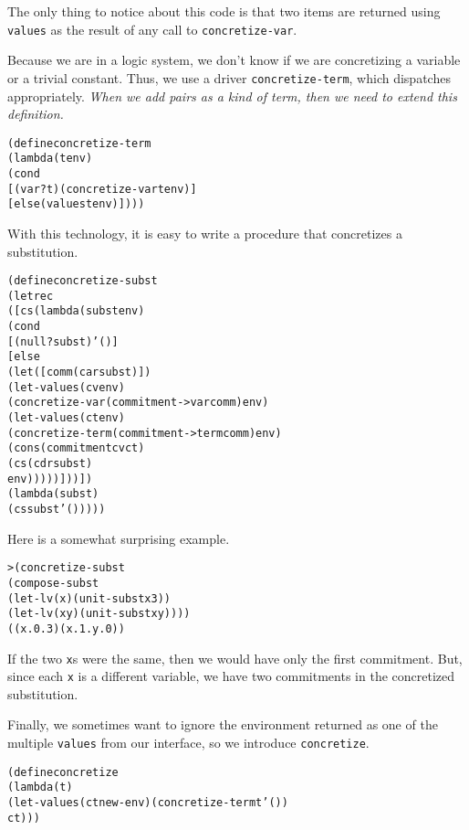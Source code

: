 \noindent
The only thing to notice about this code is that two items are returned
using \texttt{values} as the result of any call to \texttt{concretize-var}.

Because we are in a logic system, we don't know if we are concretizing
a variable or a trivial constant.  Thus, we use a driver
\texttt{concretize-term}, which dispatches appropriately.  \emph{When we add
pairs as a kind of term, then we need to extend this definition.}

\begin{alltt}
(define concretize-term
  (lambda (t env)
    (cond
      [(var? t) (concretize-var t env)]
      [else (values t env)])))
\end{alltt}

With this technology, it is easy to write a procedure that concretizes
a substitution.

\begin{alltt}
(define concretize-subst
  (letrec
    ([cs (lambda (subst env)
           (cond
             [(null? subst) '()]
             [else
               (let ([comm (car subst)])
                 (let-values (cv env)
                   (concretize-var (commitment->var comm) env)
                   (let-values (ct env)
                     (concretize-term (commitment->term comm) env)
                     (cons (commitment cv ct)
                           (cs (cdr subst)
                           env)))))]))])
    (lambda (subst)
      (cs subst '()))))
\end{alltt}

Here is a somewhat surprising example.

\begin{alltt}
> (concretize-subst
    (compose-subst
      (let-lv (x) (unit-subst x 3))
      (let-lv (x y) (unit-subst x y))))
((x.0 . 3) (x.1 . y.0))
\end{alltt}
If the two \texttt{x}s were the same, then we would have only the
first commitment.  But, since each \texttt{x} is a different variable,
we have two commitments in the concretized substitution.

Finally, we sometimes want to ignore the environment returned as one
of the multiple \texttt{values} from our interface, so we introduce
\texttt{concretize}.

\begin{alltt}
(define concretize
  (lambda (t)
    (let-values (ct new-env) (concretize-term t '())
      ct)))
\end{alltt}

